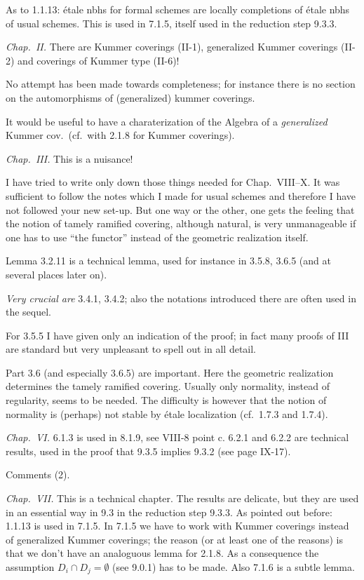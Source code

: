 \documentclass[11pt,a4paper]{article}
\begin{document}
As to 1.1.13: étale nbhs for formal schemes are locally completions of étale
nbhs of usual schemes. This is used in 7.1.5, itself used in the reduction
step 9.3.3.

\emph{Chap.\ II.} There are Kummer coverings (II-1), generalized Kummer
coverings (II-2) and coverings of Kummer type (II-6)!

No attempt has been made towards completeness; for instance there is no
section on the automorphisms of (generalized) kummer coverings.

It would be useful to have a charaterization of the Algebra of a
\emph{generalized} Kummer cov.\ (cf.\ with 2.1.8 for Kummer coverings).

\emph{Chap.\ III.} This is a nuisance!

I have tried to write only down those things needed for Chap.\ VIII--X. It was
sufficient to follow the notes which I made for usual schemes and therefore I
have not followed your new set-up. But one way or the other, one gets the
feeling that the notion of tamely ramified covering, although natural, is
very unmanageable if one has to use ``the functor'' instead of the geometric
realization itself.

Lemma 3.2.11 is a technical lemma, used for instance in 3.5.8, 3.6.5 (and
 at several places later on).

\emph{Very crucial are}  3.4.1, 3.4.2; also the notations
introduced there are often used in the sequel.

For 3.5.5 I have given only an indication of the proof; in fact many proofs
of III are standard but very unpleasant to spell out in all detail.

Part 3.6 (and especially 3.6.5) are important. Here the geometric
realization determines the tamely ramified covering. Usually only normality,
instead of regularity, seems to be needed. The difficulty is however that the
notion of normality is (perhaps) not stable by étale localization (cf.\ 1.7.3
and 1.7.4).

\emph{Chap.\ VI.} \struck{\ill{}} 6.1.3 is used in 8.1.9, see  VIII-8
point c. 6.2.1 and 6.2.2 are technical results, used in the proof that 9.3.5
implies 9.3.2 (see \struck{\ill{}} page IX-17).

Comments (2).

\emph{Chap.\ VII.} This is a technical chapter. The results are delicate, but
they are used in an essential way in 9.3 in the reduction step 9.3.3. As
pointed out before: 1.1.13 is used in 7.1.5. In 7.1.5 we have to work with
Kummer coverings instead of generalized Kummer coverings; the reason (or at
least one of the reasons) is that we don't have an analoguous lemma for
2.1.8. As a consequence the assumption $D_i \cap D_j = \emptyset$ (see 9.0.1)
has to be made. Also 7.1.6 is a subtle lemma.
\end{document}
